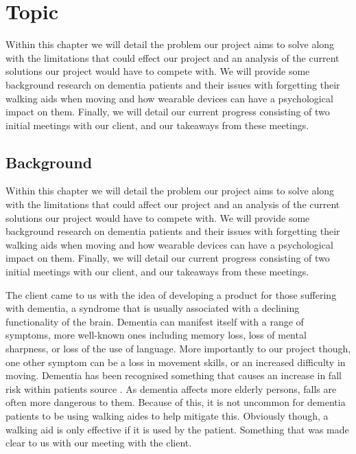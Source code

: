 \chapter{Topic} \label{ch:topic}

        Within this chapter we will detail the problem our project aims to solve along with the limitations that could
        effect our project and an analysis of the current solutions our project would have to compete with. We will
        provide some background research on dementia patients and their issues with forgetting their walking aids when
        moving and how wearable devices can have a psychological impact on them. Finally, we will detail our current
        progress consisting of two initial meetings with our client, and our takeaways from these meetings.

    \section{Background}

        Within this chapter we will detail the problem our project aims to solve along with the limitations that could
        affect our project and an analysis of the current solutions our project would have to compete with. We will
        provide some background research on dementia patients and their issues with forgetting their walking aids when
        moving and how wearable devices can have a psychological impact on them. Finally, we will detail our current
        progress consisting of two initial meetings with our client, and our takeaways from these meetings.

        The client came to us with the idea of developing a product for those suffering with dementia, a syndrome that
        is usually associated with a declining functionality of the brain. Dementia can manifest itself with a range of
        symptoms, more well-known ones including memory loss, loss of mental sharpness, or loss of the use of language.
        \cite{nhs_choices} More importantly to our project though, one other symptom can be a loss in movement skills,
        or an increased difficulty in moving. Dementia has been recognised something that causes an increase in fall
        risk within patients source
        \cite{doorn_gruber-baldini_zimmerman_hebel_port_baumgarten_quinn_taler_may_magaziner_et_al._2003}. As dementia
        affects more elderly persons, falls are often more dangerous to them. Because of this, it is not uncommon for
        dementia patients to be using walking aides to help mitigate this. Obviously though, a walking aid is only
        effective if it is used by the patient. Something that was made clear to us with our meeting with the client.

